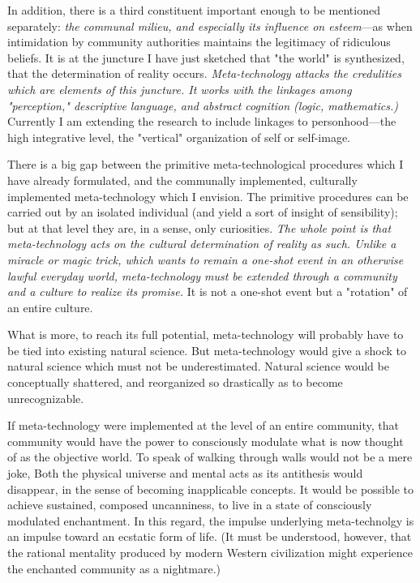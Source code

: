 In addition, there is a third constituent important enough to be mentioned 
separately: \textit{the communal milieu, and especially its influence on esteem}---as when 
intimidation by community authorities maintains the legitimacy of ridiculous 
beliefs. It is at the juncture I have just sketched that "the world" is synthesized, that 
the determination of reality occurs. \textit{Meta-technology attacks the credulities which are 
elements of this juncture. It works with the linkages among "perception," descriptive 
language, and abstract cognition (logic, mathematics.)} Currently I am extending the 
research to include linkages to personhood---the high integrative level, the "vertical" 
organization of self or self-image. 

There is a big gap between the primitive meta-technological procedures which I 
have already formulated, and the communally implemented, culturally implemented 
meta-technology which I envision. The primitive procedures can be 
carried out by an isolated individual (and yield a sort of insight of sensibility); but at 
that level they are, in a sense, only curiosities. \textit{The whole point is that meta-technology 
acts on the cultural determination of reality as such. Unlike a miracle or magic trick, 
which wants to remain a one-shot event in an otherwise lawful everyday world, 
meta-technology must be extended through a community and a culture to realize its promise.} It 
is not a one-shot event but a "rotation" of an entire culture. 

What is more, to reach its full potential, meta-technology will probably have to be 
tied into existing natural science. But meta-technology would give a shock to 
natural science which must not be underestimated. Natural science would be conceptually 
shattered, and reorganized so drastically as to become unrecognizable. 

\visbreak

If meta-technology were implemented at the level of an entire community, 
that community would have the power to consciously modulate what is now 
thought of as the objective world. To speak of walking through walls would not be a 
mere joke, Both the physical universe and mental acts as its antithesis would 
disappear, in the sense of becoming inapplicable concepts. It would be possible to 
achieve sustained, composed uncanniness, to live in a state of consciously modulated 
enchantment. In this regard, the impulse underlying meta-technolgy is an 
impulse toward an ecstatic form of life. (It must be understood, however, that the 
rational mentality produced by modern Western civilization might experience the 
enchanted community as a nightmare.) 

